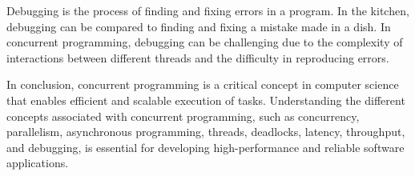 Debugging is the process of finding and fixing errors in a program.
In the kitchen, debugging can be compared to finding and fixing a mistake made in a dish.
In concurrent programming, debugging can be challenging due to the complexity of interactions between different threads and the difficulty in reproducing errors.

In conclusion, concurrent programming is a critical concept in computer science that enables efficient and scalable execution of tasks.
Understanding the different concepts associated with concurrent programming, such as concurrency, parallelism, asynchronous programming, threads, deadlocks, latency, throughput, and debugging, is essential for developing high-performance and reliable software applications.